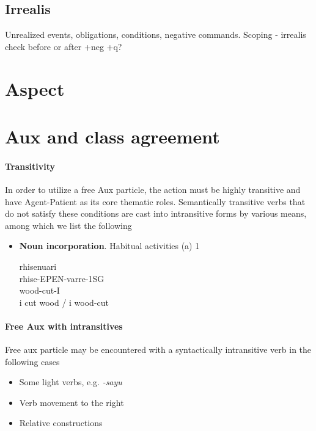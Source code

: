 \documentclass[8pt]{book}
\begin{document}
\subsection{Irrealis}
Unrealized events, obligations, conditions, negative commands. Scoping - irrealis check before or after +neg +q?

\section{Aspect}

\section{Aux and class agreement}

\paragraph{Transitivity}
In order to utilize a free Aux particle, the action must be highly transitive and have Agent-Patient as its core thematic roles. Semantically transitive verbs that do not satisfy these conditions are cast into intransitive forms by various means, among which we list the following

\begin{itemize}
\item \textbf{Noun incorporation}. Habitual activities (a)
1  
  \begin{xlista}
    \ex rhisenuari \\
        rhise-EPEN-varre-1SG \\
        wood-cut-I \\
        i cut wood / i wood-cut
  \end{xlista}

\end{itemize}

\paragraph{Free Aux with intransitives}
Free aux particle may be encountered with a syntactically intransitive verb in the following cases

\begin{itemize}
\item Some light verbs, e.g. \textit{-sayu} 
\item Verb movement to the right
\item Relative constructions
\end{itemize}
\end{document}
